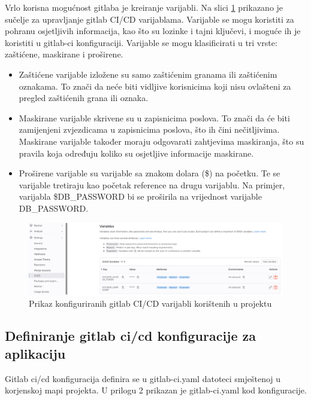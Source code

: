 \documentclass[a4paper,12pt,oneside]{article}
\begin{document}
Vrlo korisna mogućnost gitlaba je kreiranje varijabli. Na slici \ref{fig:git-variables} prikazano je sučelje za upravljanje gitlab CI/CD varijablama. Varijable se mogu koristiti za pohranu osjetljivih informacija, kao što su lozinke i tajni ključevi, i moguće ih je koristiti u gitlab-ci konfiguraciji. Varijable se mogu klasificirati u tri vrste: zaštićene, maskirane i proširene.
\begin{itemize}
    \item Zaštićene varijable izložene su samo zaštićenim granama ili zaštićenim oznakama. To znači da neće biti vidljive korisnicima koji nisu ovlašteni za pregled zaštićenih grana ili oznaka.
    \item Maskirane varijable skrivene su u zapisnicima poslova. To znači da će biti zamijenjeni zvjezdicama u zapisnicima poslova, što ih čini nečitljivima. Maskirane varijable također moraju odgovarati zahtjevima maskiranja, što su pravila koja određuju koliko su osjetljive informacije maskirane.
    \item Proširene varijable su varijable sa znakom dolara (\$) na početku. Te se varijable tretiraju kao početak reference na drugu varijablu. Na primjer, varijabla \$DB\_PASSWORD bi se proširila na vrijednost varijable DB\_PASSWORD.
\end{itemize}


\begin{figure}
    \centering
    \includegraphics[width=1\linewidth]{Slike/gitlab-variables.png}
    \caption{Prikaz konfiguriranih gitlab CI/CD varijabli korištenih u projektu}
    \label{fig:git-variables}
\end{figure}

\subsection{Definiranje gitlab ci/cd konfiguracije za aplikaciju}

Gitlab ci/cd konfiguracija definira se u gitlab-ci.yaml datoteci smještenoj u korjenskoj mapi projekta. U prilogu 2 prikazan je gitlab-ci.yaml kod konfiguracije.
\end{document}
